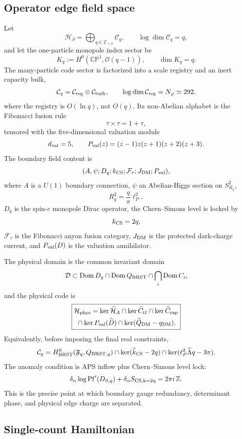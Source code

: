 \documentclass[aps,prd,reprint,nofootinbib,superscriptaddress,floatfix]{revtex4-2}
\numberwithin{equation}{section}
\theoremstyle{definition}
\theoremstyle{plain}
\newcommand{\Hbd}{\mathcal H_{\partial}}
\begin{document}
\subsection{Operator edge field space}

Let
\[
\Hbd=\bigoplus_{q\in\mathbb Z_{>0}}\mathcal C_q,\qquad
\log\dim\mathcal C_q=q ,
\]
and let the one-particle monopole index sector be
\[
K_q:=H^0(\mathbb{CP}^1,\mathcal O(q-1)),\qquad \dim K_q=q .
\]
The many-particle code sector is factorized into a scale registry and an
inert capacity bulk,
\[
\mathcal C_q=\mathcal C_{\rm reg}\otimes\mathcal C_{\rm bulk},
\qquad
\log\dim\mathcal C_{\rm reg}=N_\varphi\simeq292,
\]
where the registry is \(O(\ln q)\), not \(O(q)\).  Its non-Abelian alphabet is
the Fibonacci fusion rule
\[
\tau\times\tau=1+\tau ,
\]
tensored with the five-dimensional valuation module
\[
d_{\rm val}=5,\qquad
P_{\rm val}(z)=(z-1)z(z+1)(z+2)(z+3).
\]
The boundary field content is
\[
(A,\psi;D_q;k_{\rm CS};\mathcal F_\tau;J_{\rm DM};P_{\rm val}),
\]
where \(A\) is a \(U(1)\) boundary connection, \(\psi\) an Abelian-Higgs
section on \(S^2_{R_q}\),
\[
R_q^2=\frac{q}{\pi}\ell_P^2,
\]
\(D_q\) is the spin-\(c\) monopole Dirac operator, the Chern--Simons level is
locked by
\[
k_{\rm CS}=2q,
\]
\(\mathcal F_\tau\) is the Fibonacci anyon fusion category, \(J_{\rm DM}\) is
the protected dark-charge current, and \(P_{\rm val}(D)\) is the valuation
annihilator.

The physical domain is the common invariant domain
\[
\mathcal D\subset
\operatorname{Dom}D_q\cap\operatorname{Dom}Q_{\rm BRST}
\cap\bigcap_i\operatorname{Dom}C_i ,
\]
and the physical code is
\[
\boxed{
\begin{gathered}
\mathcal H_{\rm phys}
=
\ker\widehat{\mathcal H}_A
\cap\ker\widehat C_{\rm tf}
\cap\ker\widehat C_{\rm cap}
\\
{}\cap\ker P_{\rm val}(\widehat D)
\cap\ker(\widehat Q_{\rm DM}-q_{\rm DM}) .
\end{gathered}
}
\]
Equivalently, before imposing the final real constraints,
\[
\mathcal C_q=
H^0_{\rm BRST}(\mathfrak F_q,Q_{{\rm BRST},q})
\cap\ker(\widehat k_{\rm CS}-2q)
\cap\ker(\ell_P^2\widehat\Lambda q-3\pi).
\]
The anomaly condition is APS inflow plus Chern--Simons level lock:
\[
\delta_\alpha\log\operatorname{Pf}'(D_{\partial,q})
+\delta_\alpha S_{\rm CS,k=2q}=2\pi i\,\mathbb Z .
\]
This is the precise point at which boundary gauge redundancy, determinant
phase, and physical edge charge are separated.

\subsection{Single-count Hamiltonian}
\end{document}
